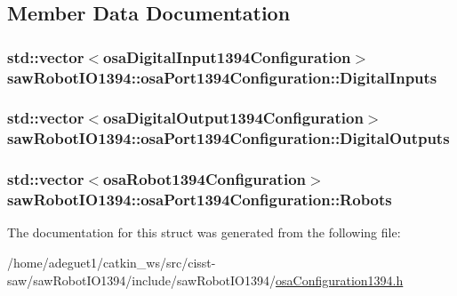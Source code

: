 \subsection{Member Data Documentation}
\hypertarget{structsaw_robot_i_o1394_1_1osa_port1394_configuration_aa3c3d154b6b2543457126359f09d1411}{
\subsubsection[{Digital\-Inputs}]{\setlength{\rightskip}{0pt plus 5cm}std\-::vector$<${\bf osa\-Digital\-Input1394\-Configuration}$>$ saw\-Robot\-I\-O1394\-::osa\-Port1394\-Configuration\-::\-Digital\-Inputs}}\label{structsaw_robot_i_o1394_1_1osa_port1394_configuration_aa3c3d154b6b2543457126359f09d1411}
\hypertarget{structsaw_robot_i_o1394_1_1osa_port1394_configuration_ab2ea227f5d5b7124c154903edbe8f2d7}{
\subsubsection[{Digital\-Outputs}]{\setlength{\rightskip}{0pt plus 5cm}std\-::vector$<${\bf osa\-Digital\-Output1394\-Configuration}$>$ saw\-Robot\-I\-O1394\-::osa\-Port1394\-Configuration\-::\-Digital\-Outputs}}\label{structsaw_robot_i_o1394_1_1osa_port1394_configuration_ab2ea227f5d5b7124c154903edbe8f2d7}
\hypertarget{structsaw_robot_i_o1394_1_1osa_port1394_configuration_ad6f5d420583316ff00715bf069fa8f99}{
\subsubsection[{Robots}]{\setlength{\rightskip}{0pt plus 5cm}std\-::vector$<${\bf osa\-Robot1394\-Configuration}$>$ saw\-Robot\-I\-O1394\-::osa\-Port1394\-Configuration\-::\-Robots}}\label{structsaw_robot_i_o1394_1_1osa_port1394_configuration_ad6f5d420583316ff00715bf069fa8f99}


The documentation for this struct was generated from the following file\-:\begin{DoxyCompactItemize}
\item 
/home/adeguet1/catkin\-\_\-ws/src/cisst-\/saw/saw\-Robot\-I\-O1394/include/saw\-Robot\-I\-O1394/\hyperlink{osa_configuration1394_8h}{osa\-Configuration1394.\-h}\end{DoxyCompactItemize}
